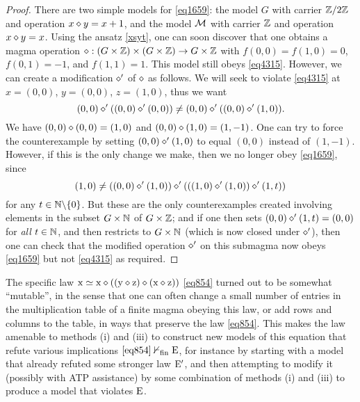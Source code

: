 \begin{proof}  There are two simple models for \eqref{eq1659}: the model $G$ with carrier $\mathbb{Z}/2\mathbb{Z}$ and operation $x \diamond y = x+1$, and the model ${\mathcal{M}}$ with carrier $\mathbb{Z}$ and operation $x \diamond y = x$.  Using the ansatz \eqref{xsyt}, one can soon discover that one obtains a magma operation $\diamond: (G \times \mathbb{Z}) \times (G \times \mathbb{Z}) \to G \times \mathbb{Z}$ with $f(0,0)=f(1,0)=0$, $f(0,1)=-1$, and $f(1,1)=1$.  This model still obeys \eqref{eq4315}. However, we can create a modification $\diamond'$ of $\diamond$ as follows.  We will seek to violate \eqref{eq4315} at $x = (0,0)$, $y = (0,0)$, $z = (1,0)$, thus we want
$$ (0,0) \diamond' ((0,0) \diamond' (0,0)) \neq (0,0) \diamond' ((0,0) \diamond' (1,0)).$$
We have $(0,0) \diamond (0,0) = (1,0)$ and $(0,0) \diamond (1,0) = (1,-1)$.  One can try to force the counterexample by setting $(0,0) \diamond' (1,0)$ to equal $(0,0)$ instead of $(1,-1)$. However, if this is the only change we make, then we no longer obey \eqref{eq1659}, since
$$ (1,0) \neq ((0,0) \diamond' (1,0)) \diamond' (((1,0) \diamond' (1,0)) \diamond' (1,t))$$
for any $t \in \mathbb{N} \backslash \{0\}$. But these are the only counterexamples created involving elements in the subset $G \times \mathbb{N}$ of $G \times \mathbb{Z}$; and if one then sets $(0,0) \diamond' (1,t) = (0,0)$ for \emph{all} $t \in \mathbb{N}$, and then restricts to $G \times \mathbb{N}$ (which is now closed under $\diamond'$), then one can check that the modified operation $\diamond'$ on this submagma now obeys \eqref{eq1659} but not \eqref{eq4315} as required.
\end{proof}

The specific law $\mathrm{x} \simeq \mathrm{x} \diamond ((\mathrm{y} \diamond \mathrm{z}) \diamond (\mathrm{x} \diamond \mathrm{z}))$ \eqref{eq854} turned out to be somewhat ``mutable'', in the sense that one can often change a small number
 of entries in the multiplication table of a finite magma obeying this law, or add rows and columns to the table,
 in ways that preserve the law \eqref{eq854}.  This makes the law amenable to methods (i) and (iii) to construct new models of this equation that
 refute various implications  $\eqref{eq854} \nvdash_{\mathrm{fin}} \mathrm{E}$, for instance by starting with a model that already refuted some stronger law ${\mathrm{E}'}$, and then attempting to modify it
 (possibly with ATP assistance) by some combination of methods (i) and (iii) to produce a model that violates $\mathrm{E}$.

